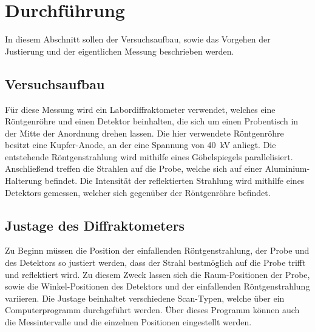 \section{Durchführung}
\label{sec:durchfuehrung}

In diesem Abschnitt sollen der Versuchsaufbau,
sowie das Vorgehen der Justierung und der eigentlichen Messung beschrieben werden.


\subsection{Versuchsaufbau}

Für diese Messung wird ein Labordiffraktometer verwendet,
welches eine Röntgenröhre und einen Detektor beinhalten,
die sich um einen Probentisch in der Mitte der Anordnung drehen lassen.
Die hier verwendete Röntgenröhre besitzt eine Kupfer-Anode,
an der eine Spannung von \SI{40}{\kilo\volt} anliegt.
Die entstehende Röntgenstrahlung wird mithilfe eines Göbelspiegels parallelisiert.
Anschließend treffen die Strahlen auf die Probe,
welche sich auf einer Aluminium-Halterung befindet.
Die Intensität der reflektierten Strahlung wird mithilfe eines Detektors gemessen,
welcher sich gegenüber der Röntgenröhre befindet.


\subsection{Justage des Diffraktometers}

Zu Beginn müssen die Position der einfallenden Röntgenstrahlung,
der Probe und des Detektors so justiert werden,
dass der Strahl bestmöglich auf die Probe trifft und reflektiert wird.
Zu diesem Zweck lassen sich die Raum-Positionen der Probe,
sowie die Winkel-Positionen des Detektors und der einfallenden Röntgenstrahlung variieren.
Die Justage beinhaltet verschiedene Scan-Typen,
welche über ein Computerprogramm durchgeführt werden.
Über dieses Programm können auch die Messintervalle und die einzelnen Positionen eingestellt werden.

